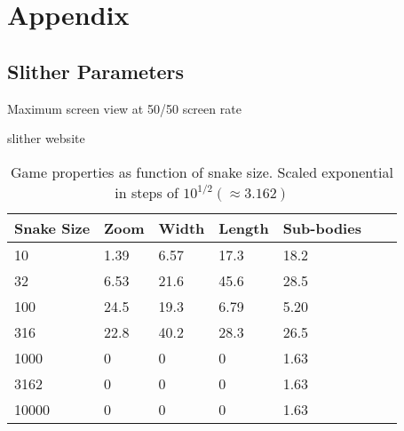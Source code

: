 \thispagestyle{empty}

\section*{Appendix}

\subsection*{Slither Parameters}
Maximum screen view at 50/50 screen rate

slither website


\begin{table}[H]
    \centering
    \caption{Game properties as function of snake size. Scaled exponential in steps of $10^{1/2} (\approx 3.162)$} 
    \label{Table: fission yields}
    \begin{tabular}{|l|l|l|l|l|l|l|}
    \hline
    
    Snake Size               & Zoom         & Width          & Length           & Sub-bodies  \\ \hline
    10                      & 1.39       & 6.57             & 17.3                & 18.2  \\ \hline
    32                      & 6.53           & 21.6          & 45.6             & 28.5 \\ \hline
    100                      & 24.5         & 19.3           & 6.79             & 5.20  \\ \hline
    316                     & 22.8       & 40.2             & 28.3               & 26.5  \\ \hline
    1000                     & 0             & 0             & 0                & 1.63    \\ \hline
    3162                    & 0           & 0            & 0                 & 1.63    \\ \hline
    10000                    & 0           & 0            & 0                 & 1.63    \\ \hline

    \end{tabular}
\end{table}



